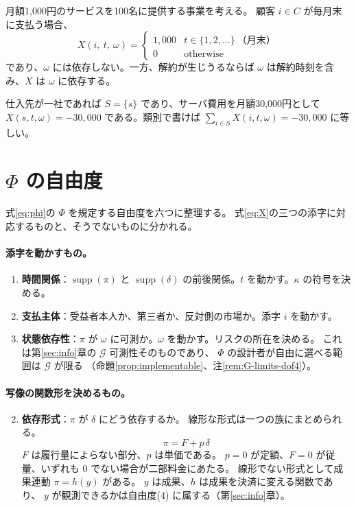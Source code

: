 \begin{example}[三重添字の具体化]
\label{ex:triple-index}
月額1,000円のサービスを100名に提供する事業を考える。
顧客 $i\in C$ が毎月末に支払う場合、
\[
X(i,\ t,\ \omega) = \begin{cases} 1{,}000 & t \in \{1,2,\dots\}\ \text{（月末）} \\ 0 & \text{otherwise}\end{cases}
\]
であり、$\omega$ には依存しない。一方、解約が生じうるならば
$\omega$ は解約時刻を含み、$X$ は $\omega$ に依存する。

仕入先が一社であれば $S=\{s\}$ であり、サーバ費用を月額30,000円として
$X(s,t,\omega)=-30{,}000$ である。類別で書けば
$\sum_{i\in S}X(i,t,\omega)=-30{,}000$ に等しい。
\end{example}


\section{\texorpdfstring{$\Phi$}{Φ} の自由度}
\label{sec:dof}

式\eqref{eq:phi}の $\Phi$ を規定する自由度を六つに整理する。
式\eqref{eq:X}の三つの添字に対応するものと、そうでないものに分かれる。

\paragraph{添字を動かすもの。}
\begin{enumerate}[label=(\arabic*)]
\item \textbf{時間関係}：$\operatorname{supp}(\pi)$ と $\operatorname{supp}(\delta)$ の前後関係。$t$ を動かす。$\kappa$ の符号を決める。
\setcounter{enumi}{2}
\item \textbf{支払主体}：受益者本人か、第三者か、反対側の市場か。添字 $i$ を動かす。
\item \textbf{状態依存性}：$\pi$ が $\omega$ に可測か。$\omega$ を動かす。リスクの所在を決める。
これは第\ref{sec:info}章の $\mathcal{G}$ 可測性そのものであり、
$\Phi$ の設計者が自由に選べる範囲は $\mathcal{G}$ が限る
（命題\ref{prop:implementable}、注\ref{rem:G-limits-dof4}）。
\end{enumerate}

\paragraph{写像の関数形を決めるもの。}
\begin{enumerate}[label=(\arabic*)]
\setcounter{enumi}{1}
\item \textbf{依存形式}：$\pi$ が $\delta$ にどう依存するか。
線形な形式は一つの族にまとめられる。
\begin{equation}
\pi = F + p\,\delta
\label{eq:two-part}
\end{equation}
$F$ は履行量によらない部分、$p$ は単価である。
$p=0$ が定額、$F=0$ が従量、いずれも $0$ でない場合が二部料金にあたる。
線形でない形式として成果連動 $\pi = h(y)$ がある。
$y$ は成果、$h$ は成果を決済に変える関数であり、
$y$ が観測できるかは自由度(4) に属する（第\ref{sec:info}章）。
\end{enumerate}

